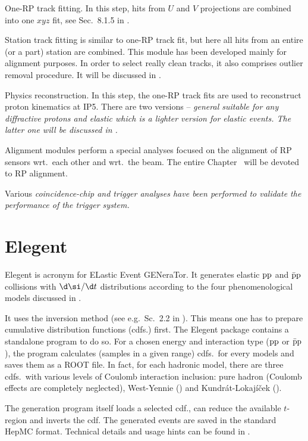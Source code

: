 \> One-RP track fitting.
In this step, hits from $U$ and $V$ projections are combined into one $xyz$ fit, see Sec.~8.1.5 in .

\> Station track fitting is similar to one-RP track fit, but here all hits from an entire (or a part) station are combined. This module has been developed mainly for alignment purposes. In order to select really clean tracks, it also comprises outlier removal procedure. It will be discussed in .

\> Physics reconstruction.
In this step, the one-RP track fits are used to reconstruct proton kinematics at IP5. There are two versions -- \em{general} suitable for any diffractive protons and \em{elastic} which is a lighter version for elastic events. The latter one will be discussed in .

\> Alignment modules perform a special analyses focused on the alignment of RP sensors wrt.~each other and wrt.~the beam. The entire Chapter~ will be devoted to RP alignment. 

\> Various \em{coincidence-chip and trigger analyses} have been performed to validate the performance of the trigger system.

\section[elegent]{Elegent}

Elegent is acronym for ELastic Event GENeraTor. It generates elastic $\rm pp$ and $\rm\bar pp$ collisions with $\d\si/\d t$ distributions according to the four phenomenological models discussed in .

It uses the inversion method (see e.g.~Sc.~2.2 in ). This means one has to prepare cumulative distribution functions (cdfs.) first. The Elegent package contains a standalone program to do so. For a chosen energy and interaction type ($\rm pp$ or $\rm\bar pp$), the program calculates (samples in a given range) cdfs.~for every models and saves them as a ROOT file. In fact, for each hadronic model, there are three cdfs.~with various levels of Coulomb interaction inclusion: pure hadron (Coulomb effects are completely neglected), West-Yennie () and Kundr\' at-Lokaj\' i\v cek ().

The generation program itself loads a selected cdf., can reduce the available $t$-region and inverts the cdf. The generated events are saved in the standard HepMC  format. Technical details and usage hints can be found in .


